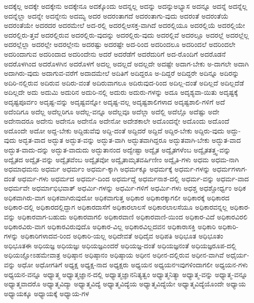 {ಅದಕ್ಕೆಲ್ಲ
ಅದಕ್ಕೇ
ಅದಕ್ಕೇನು
ಅದಕ್ಕೇನೂ
ಅದಕ್ಕೊಂದು
ಅದನ್ನಲ್ಲ
ಅದನ್ನು
ಅದನ್ನುಅಭ್ಯಾಸ
ಅದನ್ನೂ
ಅದನ್ನೆ
ಅದನ್ನೆಲ್ಲ
ಅದನ್ನೆಲ್ಲಾ
ಅದನ್ನೇ
ಅದನ್ನೇನು
ಅದಮ್ಯ
ಅದರ
ಅದರಂತಾಗದೆ
ಅದರಂತಾಗು-ವುದು
ಅದರಂತೆ
ಅದರಂತೆಯೆ
ಅದರಂತೆಯೇ
ಅದರದರ
ಅದರಮೇಲೆ
ಅದ-ರಲ್ಲಿ
ಅದರಲ್ಲಿಆಸಕ್ತ-ವಾಗಿದೆ
ಅದರಲ್ಲಿಯೂ
ಅದರಲ್ಲಿಯೆ
ಅದರಲ್ಲಿಯೇ
ಅದರಲ್ಲಿರು-ತ್ತವೆ
ಅದರಲ್ಲಿರುವ
ಅದರಲ್ಲಿರು-ವುದನ್ನು
ಅದರಲ್ಲಿರು-ವುದು
ಅದರಲ್ಲಿವೆ
ಅದರಲ್ಲೂ
ಅದರಲ್ಲೆ
ಅದರಲ್ಲೆಲ್ಲ
ಅದರಲ್ಲೆಲ್ಲಾ
ಅದರಲ್ಲೇ
ಅದರಲ್ಲೇನು
ಅದರಷ್ಟು
ಅದರಷ್ಟೇ
ಅದ-ರಿಂದ
ಅದರಿಂದಲೂ
ಅದರಿಂದಲೆ
ಅದರಿಂದಲೇ
ಅದರಿಂದಾಗುವ
ಅದರಿಂದಾದ
ಅದರಿಂದೇನು
ಅದರೆ
ಅದರೆಡೆಗೆ
ಅದರೆದುರಿಗೆ
ಅದ-ರೊಂದಿಗೆ
ಅದರೊಡನೆ
ಅದರೊಳಗಿಂದ
ಅದರೊಳಗಿನ
ಅದರೊಳಗೆ
ಅದಲ್ಲ
ಅದಲ್ಲದೆ
ಅದಲ್ಲದೇ
ಅದಷ್ಟೇ
ಅದಾಗ-ಬೇಕು
ಅ-ದಾಗಲೇ
ಅದಾಗಿ
ಅದಾಗಿರು-ವುದು
ಅದಾಗುವ-ವರೆಗೆ
ಅದಾದಮೇಲೆ
ಅದಿತಿಗೆ
ಅದಿದ್ದರೂ
ಅ-ದಿದ್ದರೆ
ಅದಿದ್ದರೇ
ಅದಿನ್ನೂ
ಅದಿರನ್ನು
ಅದಿರಿ-ನಲ್ಲಿರುವ
ಅದಿರುವ
ಅದಿರು-ವಂತೆ
ಅದಿರುವಾಗಲೂ
ಅದಿರುವುದ-ರಿಂದ
ಅದಿಲ್ಲ-ದಂತೆ
ಅದಿಲ್ಲದೆ
ಅದಿಲ್ಲದೆಡೆ
ಅದಿಲ್ಲದೇ
ಅದು
ಅದುಮಿ
ಅದುರಿನ
ಅದುರಿ-ನಲ್ಲಿ
ಅದುರು
ಅದುರು-ಗಳನ್ನು
ಅದೂ
ಅದೃಶ್ಯವಾ-ಯಿತು
ಅದೃಷ್ಟಕ್ಕೆ
ಅದೃಷ್ಟಪೂರ್ವಂ
ಅದೃಷ್ಟ-ವನ್ನು
ಅದೃಷ್ಟವನ್ನೋ
ಅದೃಷ್ಟ-ವಲ್ಲ
ಅದೃಷ್ಟಶಾಲಿಗಳಾದ
ಅದೃಷ್ಟಶಾಲಿ-ಗಳಿಗೆ
ಅದೆ
ಅದೆಂದಿಗೂ
ಅದೆಲ್ಲ
ಅದೆಲ್ಲರಿಗೂ
ಅದೆಲ್ಲ-ವನ್ನೂ
ಅದೆಲ್ಲವೂ
ಅದೆಲ್ಲಾ
ಅದೆಲ್ಲಿ
ಅದೆಲ್ಲೊ
ಅದೆಷ್ಟು
ಅದೇ
ಅದೇನಾದರೂ
ಅದೇನು
ಅದೇನೂ
ಅದೇನೊ
ಅದೇನೋ
ಅದೇಶಕಾಲೇ
ಅದೊಂದನ್ನೇ
ಅದೊಂದು
ಅದೊಂದೆ
ಅದೊಂದೇ
ಅದೋ
ಅದ್ದ-ಬೇಕು
ಅದ್ದಿಡುವೆವು
ಅದ್ದಿ-ದಂತೆ
ಅದ್ದಿದರೆ
ಅದ್ದಿದೆ
ಅದ್ದಿರ-ಬೇಕು
ಅದ್ದಿರು-ವುದು
ಅದ್ದು-ವುದು
ಅದ್ಭತ-ವಾದ
ಅದ್ಭುತ
ಅದ್ಭುತ-ವನ್ನು
ಅದ್ಭುತ-ವಾಗಿ
ಅದ್ಭುತವಾಗಿದ್ದರೂ
ಅದ್ಭುತವಾಗಿ-ಬೇಕು
ಅದ್ಭುತ-ವಾದ
ಅದ್ಭುತ-ವಾದು-ದನ್ನು
ಅದ್ಭುತ-ವಾದುದು
ಅದ್ಭುತಾನಂದ
ಅದ್ವೇಷ್ಟಾ
ಅದ್ವೈತ
ಅದ್ವೈತಗಳೆಂಬ
ಅದ್ವೈತತತ್ತ್ವ-ವನ್ನು
ಅದ್ವೈತದ
ಅದ್ವೈತ-ವನ್ನು
ಅದ್ವೈತವೆಂಬ
ಅದ್ವೈತವೋ
ಅದ್ವೈತಾಮೃತವರ್ಷಿಣೀಂ
ಅದ್ವೈತಿ-ಗಳು
ಅಧಮ
ಅಧಮ-ನಾಗಿ
ಅಧಮಾಧಮನು
ಅಧರ್ಮ
ಅಧರ್ಮಂ
ಅಧರ್ಮ-ಕ್ಕಾಗಿ
ಅಧರ್ಮಕ್ಕೂ
ಅಧರ್ಮಕ್ಕೆ
ಅಧರ್ಮ-ಗಳನ್ನು
ಅಧರ್ಮಗಳಾಗ-ದಂತೆ
ಅಧರ್ಮ-ಗಳು
ಅಧರ್ಮದ
ಅಧರ್ಮ-ದಿಂದ
ಅಧರ್ಮದ್ದೆ
ಅಧರ್ಮನಾಶ-ದಲ್ಲಿ
ಅಧರ್ಮ-ವನ್ನು
ಅಧರ್ಮ-ವಾದ
ಅಧರ್ಮವೇ
ಅಧರ್ಮಾಭಿಭವಾತ್
ಅಧರ್ಮಿ-ಗಳನ್ನು
ಅಧರ್ಮಿ-ಗಳಿಗೆ
ಅಧರ್ಮಿ-ಗಳು
ಅಧಶ್ಚ
ಅಧಶ್ಚೋರ್ಧ್ವಂ
ಅಧಿಕ
ಅಧಿಕವಾಗಿರು-ವಾಗ
ಅಧಿಕವಾಗಿರುವುದೋ
ಅಧಿಕವಾಗುತ್ತ
ಅಧಿಕಾರ
ಅಧಿಕಾರಕ್ಕಾಗಲೀ
ಅಧಿಕಾರಕ್ಕೆ
ಅಧಿಕಾರದ
ಅಧಿಕಾರ-ದಲ್ಲಿ
ಅಧಿಕಾರದಲ್ಲಿದ್ದಾಗ
ಅಧಿಕಾರದಾಸೆಗೆ
ಅಧಿಕಾರಲಾಲಸೆ
ಅಧಿಕಾರಲಾಲಸೆಯೂ
ಅಧಿಕಾರವನ್ನಲ್ಲ
ಅಧಿಕಾರ-ವನ್ನು
ಅಧಿಕಾರವಾಗ-ಬಹುದು
ಅಧಿಕಾರವಾಗಲಿ
ಅಧಿಕಾರವಾಣಿ
ಅಧಿಕಾರವಾಣಿ-ಯಿಂದ
ಅಧಿಕಾರ-ವಿದೆ
ಅಧಿಕಾರವಿರಲಿ
ಅಧಿಕಾರವಿರು-ವಾಗ
ಅಧಿಕಾರವಿರುವುದೊ
ಅಧಿಕಾರ-ವಿಲ್ಲ
ಅಧಿಕಾರವಿಲ್ಲದವನ
ಅಧಿಕಾರಾಸಕ್ತಿ
ಅಧಿಕಾರಿ
ಅಧಿಕಾರಿ-ಗಳನ್ನು
ಅಧಿಕಾರಿಗಳಾದವ-ರಿಂದ
ಅಧಿಕಾರಿ-ಯಲ್ಲ
ಅಧಿದೇವತೆ
ಅಧಿದೈವ
ಅಧಿಪತಿ
ಅಧಿಭೂತ
ಅಧಿಭೂತಂ
ಅಧಿಭೂತಈ
ಅಧಿಯಜ್ಞ
ಅಧಿಯಜ್ಞಃ
ಅಧಿಯಜ್ಞಎಂದರೆ
ಅಧಿಯಜ್ಞ-ದಂತೆ
ಅಧಿಯಜ್ಞನಂತೆ
ಅಧಿಯಜ್ಞರೂಪ-ದಲ್ಲಿ
ಅಧಿಯಜ್ಞೋಽಹಮೇವಾತ್ರ
ಅಧಿಷ್ಠಾನ
ಅಧಿಷ್ಠಾನಂ
ಅಧಿಷ್ಠಾಯ
ಅಧೀನ
ಅಧೀನ-ದಲ್ಲಿರುವ
ಅಧೀನ-ವಾಗಿವೆ
ಅಧೈರ್ಯ-ವನ್ನು
ಅಧೋ
ಅಧೋಗತಿಗೆ
ಅಧ್ಯಕ್ಷ
ಅಧ್ಯಕ್ಷ-ನಾದ
ಅಧ್ಯಕ್ಷರು
ಅಧ್ಯಯನ
ಅಧ್ಯಯನಇವುಗಳಿಂದಾಗಲೀ
ಅಧ್ಯಯನ-ಗಳು
ಅಧ್ಯಯನ-ವನ್ನೂ
ಅಧ್ಯಾತ್ಮ
ಅಧ್ಯಾತ್ಮಜ್ಞಾನ-ದಲ್ಲಿ
ಅಧ್ಯಾತ್ಮಜ್ಞಾನನಿತ್ಯತ್ವಂ
ಅಧ್ಯಾತ್ಮನಿತ್ಯಾ
ಅಧ್ಯಾತ್ಮ-ವನ್ನು
ಅಧ್ಯಾತ್ಮ-ವನ್ನೂ
ಅಧ್ಯಾತ್ಮವಾದರೊ
ಅಧ್ಯಾತ್ಮವಿದ್ಯಾ
ಅಧ್ಯಾತ್ಮವಿದ್ಯೆ
ಅಧ್ಯಾತ್ಮವಿದ್ಯೆಯ
ಅಧ್ಯಾತ್ಮವಿದ್ಯೆಯೇ
ಅಧ್ಯಾತ್ಮವಿದ್ಯೆಯೊಂದೇ
ಅಧ್ಯಾಯ
ಅಧ್ಯಾಯಕ್ಕೂ
ಅಧ್ಯಾಯಕ್ಕೆ
ಅಧ್ಯಾಯ-ಗಳ
}
